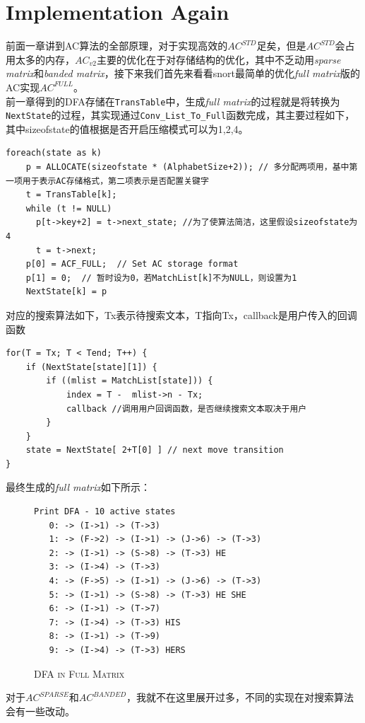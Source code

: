 \documentclass{article}
\begin{document}
\section{Implementation Again}
前面一章讲到AC算法的全部原理，对于实现高效的$AC^{STD}$足矣，但是$AC^{STD}$会占用太多的内存，$AC_{v2}$主要的优化在于对存储结构的优化，其中不乏动用\textit{sparse matrix}和\textit{banded matrix}，接下来我们首先来看看snort最简单的优化\textit{full matrix}版的AC实现$AC^{FULL}$。\\
前一章得到的DFA存储在\lstinline|TransTable|中，生成\textit{full matrix}的过程就是将转换为\lstinline|NextState|的过程，其实现通过\lstinline|Conv_List_To_Full|函数完成，其主要过程如下，其中sizeofstate的值根据是否开启压缩模式可以为1,2,4。
\begin{lstlisting}
foreach(state as k)
    p = ALLOCATE(sizeofstate * (AlphabetSize+2)); // 多分配两项用，基中第一项用于表示AC存储格式，第二项表示是否配置关键字
    t = TransTable[k];
    while (t != NULL)
      p[t->key+2] = t->next_state; //为了使算法简洁，这里假设sizeofstate为4
      t = t->next;
    p[0] = ACF_FULL;  // Set AC storage format
    p[1] = 0;  // 暂时设为0，若MatchList[k]不为NULL，则设置为1
    NextState[k] = p
\end{lstlisting}
对应的搜索算法如下，Tx表示待搜索文本，T指向Tx，callback是用户传入的回调函数
\begin{lstlisting}
for(T = Tx; T < Tend; T++) {
    if (NextState[state][1]) {
        if ((mlist = MatchList[state])) {
            index = T -  mlist->n - Tx;
            callback //调用用户回调函数，是否继续搜索文本取决于用户
        }
    }
    state = NextState[ 2+T[0] ] // next move transition
}
\end{lstlisting}
最终生成的\textit{full matrix}如下所示：
\begin{figure}[h]
  \centering
\caption{\textsc{DFA in Full Matrix}}
\begin{verbatim}
Print DFA - 10 active states
   0: -> (I->1) -> (T->3)
   1: -> (F->2) -> (I->1) -> (J->6) -> (T->3)
   2: -> (I->1) -> (S->8) -> (T->3) HE
   3: -> (I->4) -> (T->3)
   4: -> (F->5) -> (I->1) -> (J->6) -> (T->3)
   5: -> (I->1) -> (S->8) -> (T->3) HE SHE
   6: -> (I->1) -> (T->7)
   7: -> (I->4) -> (T->3) HIS
   8: -> (I->1) -> (T->9)
   9: -> (I->4) -> (T->3) HERS
\end{verbatim}
\end{figure}

对于$AC^{SPARSE}$和$AC^{BANDED}$，我就不在这里展开过多，不同的实现在对搜索算法会有一些改动。
\end{document}
